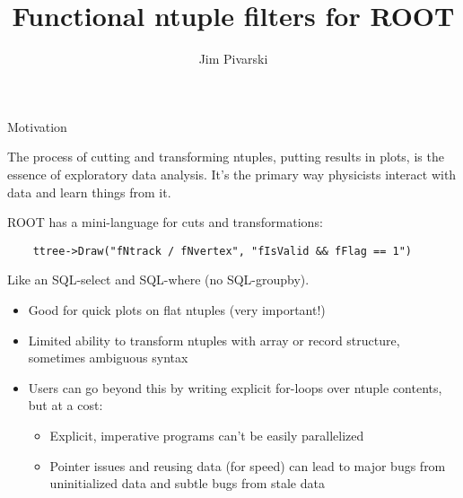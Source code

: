 \documentclass{beamer}
\title{Functional ntuple filters for ROOT}
\author{Jim Pivarski}
\begin{document}
\begin{frame}
  \titlepage
\end{frame}

\begin{frame}[fragile]{Motivation}

\begin{block}{}
The process of cutting and transforming ntuples, putting results in plots, is the essence of exploratory data analysis. It's the primary way physicists interact with data and learn things from it.
\end{block}

\begin{block}{}
ROOT has a mini-language for cuts and transformations:
{\scriptsize \begin{verbatim}
    ttree->Draw("fNtrack / fNvertex", "fIsValid && fFlag == 1")
\end{verbatim}}
Like an SQL-select and SQL-where (no SQL-groupby).
\end{block}

\begin{itemize}
\item Good for quick plots on flat ntuples (very important!)
\item Limited ability to transform ntuples with array or record structure, sometimes ambiguous syntax
\item Users can go beyond this by writing explicit for-loops over ntuple contents, but at a cost:
\begin{itemize}
\item Explicit, imperative programs can't be easily parallelized
\item Pointer issues and reusing data (for speed) can lead to major bugs from uninitialized data and subtle bugs from stale data
\end{itemize}
\end{itemize}
\end{frame}
\end{document}
